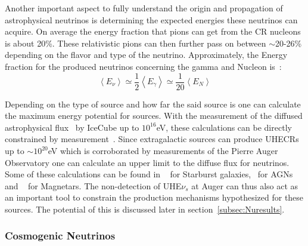 Another important aspect to fully understand the origin and propagation of astrophysical neutrinos is determining the expected energies these neutrinos can acquire. On average the energy fraction that pions can get from the \gls*{CR} nucleons is about 20\%. These relativistic pions can then further pass on between $\sim$20-26\% depending on the flavor and type of the neutrino. Approximately, the Energy fraction for the produced neutrinos concerning the gamma and Nucleon is~\cite{Lipari_2007}:
\begin{equation}
  \left\langle E_{\nu} \right\rangle  \simeq  \frac{1}{2}\left\langle E_{\gamma} \right\rangle \simeq  \frac{1}{20}\left\langle E_{N} \right\rangle
  \end{equation}

Depending on the type of source and how far the said source is one can calculate the maximum energy potential for sources. With the measurement of the diffused astrophysical flux~\cite{PhysRevD.110.022001} by IceCube up to $10^{16}$eV, these calculations can be directly constrained by measurement~\cite{Abbasi_2023_supernova_emission}. Since extragalactic sources can produce \glspl{UHECR} up to $\sim 10^{20}$eV which is corroborated by measurements of the Pierre Auger Observatory one can calculate an upper limit to the diffuse flux for neutrinos. Some of these calculations can be found in ~\cite{Condorelli_2023_starburst} for Starburst galaxies, ~\cite{Murase_2023}for AGNs and ~\cite{2003ApJ...595..346Z} for Magnetars. The non-detection of UHE$\nu_s$ at Auger can thus also act as an important tool to constrain the production mechanisms hypothesized for these sources. The potential of this is discussed later in section~\ref{subsec:Nuresults}.   

\subsubsection*{Cosmogenic Neutrinos}
\label{subsubsec:CosmoNu}

